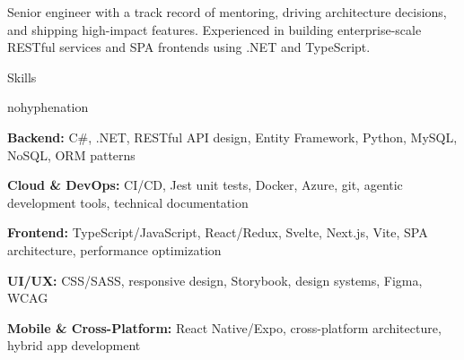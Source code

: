 \documentclass[
	10pt, %
]{article} %
\begin{document}
\printname

Senior engineer with a track record of mentoring, driving architecture decisions, and shipping high-impact features.
Experienced in building enterprise-scale RESTful services and SPA frontends using .NET and TypeScript.

\begin{rSection}{Skills}
	\begin{hyphenrules}{nohyphenation}

		\begin{rSubsection}{}{}{}{}
			\item[] \textbf{Backend:} C\#, .NET, RESTful API design, Entity Framework, Python, MySQL, NoSQL, ORM patterns
			\item[] \textbf{Cloud \& DevOps:} CI/CD, Jest unit tests, Docker, Azure, git, agentic development tools, technical documentation
			\item[] \textbf{Frontend:} TypeScript/JavaScript, React/Redux, Svelte, Next.js, Vite, SPA architecture, performance optimization
			\item[] \textbf{UI/UX:} CSS/SASS, responsive design, Storybook, design systems, Figma, WCAG
			\item[] \textbf{Mobile \& Cross-Platform:} React Native/Expo, cross-platform architecture, hybrid app development
		\end{rSubsection}

	\end{hyphenrules}
\end{rSection}
\end{document}
